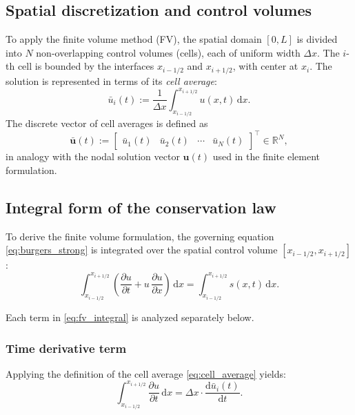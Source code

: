 \subsection{Spatial discretization and control volumes}

To apply the finite volume method (FV), the spatial domain \( [0, L] \) is divided into \( N \) non-overlapping control volumes (cells), each of uniform width \( \Delta x \). The \( i \)-th cell is bounded by the interfaces \( x_{i-1/2} \) and \( x_{i+1/2} \), with center at \( x_i \). The solution is represented in terms of its \textit{cell average}:
\begin{equation}
\bar{u}_i(t) := \frac{1}{\Delta x} \int_{x_{i-1/2}}^{x_{i+1/2}} u(x,t)\,\mathrm{d}x.
\label{eq:cell_average}
\end{equation}
The discrete vector of cell averages is defined as
\begin{equation}
\bar{\mathbf{u}}(t) := \begin{bmatrix} \bar{u}_1(t) & \bar{u}_2(t) & \cdots & \bar{u}_N(t) \end{bmatrix}^\top \in \mathbb{R}^N,
\end{equation}
in analogy with the nodal solution vector \( \mathbf{u}(t) \) used in the finite element formulation.

\subsection{Integral form of the conservation law}

To derive the finite volume formulation, the governing equation \eqref{eq:burgers_strong} is integrated over the spatial control volume \( [x_{i-1/2}, x_{i+1/2}] \):
\begin{equation}
\int_{x_{i-1/2}}^{x_{i+1/2}} 
\left( \frac{\partial u}{\partial t} + u\,\frac{\partial u}{\partial x} \right)\,\mathrm{d}x 
= \int_{x_{i-1/2}}^{x_{i+1/2}} s(x,t)\,\mathrm{d}x.
\label{eq:fv_integral}
\end{equation}

Each term in \eqref{eq:fv_integral} is analyzed separately below.

\subsubsection*{Time derivative term}

Applying the definition of the cell average \eqref{eq:cell_average} yields:
\begin{equation}
\int_{x_{i-1/2}}^{x_{i+1/2}} \frac{\partial u}{\partial t}\,\mathrm{d}x 
= \Delta x \cdot \frac{\mathrm{d} \bar{u}_i(t)}{\mathrm{d}t}.
\end{equation}

